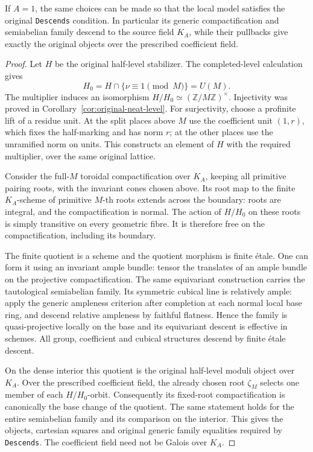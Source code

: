 \begin{proposition}
\label{prop:pel-original-generic-descent}
If $A=1$, the same choices can be made so that the local model
satisfies the original \texttt{Descends} condition.  In particular
its generic compactification and semiabelian family descend to
the source field $K_A$, while their pullbacks give exactly the
original objects over the prescribed coefficient field.
\end{proposition}
\begin{proof}
Let $H$ be the original half-level stabilizer.  The completed-level
calculation gives
\[
 H_0=H\cap\{\nu\equiv1\pmod M\}=U(M).
\]
The multiplier induces an isomorphism
$H/H_0\simeq(\mathbb Z/M\mathbb Z)^\times$.
Injectivity was proved in Corollary~\ref{cor:original-neat-level}.
For surjectivity, choose a profinite lift of a residue unit.  At
the split places above $M$ use the coefficient unit $(1,r)$,
which fixes the half-marking and has norm $r$; at the other places
use the unramified norm on units.  This constructs an element of
$H$ with the required multiplier, over the same original lattice.

Consider the full-$M$ toroidal compactification over $K_A$, keeping
all primitive pairing roots, with the invariant cones chosen above.
Its root map to the finite \(K_A\)-scheme of primitive $M$-th
roots extends across the boundary: roots are integral, and the
compactification is normal.  The action of $H/H_0$ on these roots
is simply transitive on every geometric fibre.  It is therefore
free on the compactification, including its boundary.

The finite quotient is a scheme and the quotient morphism is
finite \'etale.  One can form it using an invariant ample bundle:
tensor the translates of an ample bundle on the projective
compactification.  The same equivariant construction carries the
tautological semiabelian family.  Its symmetric cubical line is
relatively ample: apply the generic ampleness criterion
\cite[Lemma 4.2.1.6]{level-symmetry-lan} after completion at each
normal local base ring, and descend relative ampleness by faithful
flatness.  Hence the family is
quasi-projective locally on the base and its equivariant descent
is effective in schemes.  All group, coefficient and cubical
structures descend by finite \'etale descent.

On the dense interior this quotient is the original half-level
moduli object over $K_A$.  Over the prescribed coefficient field,
the already chosen root $\zeta_M$ selects one member of each
$H/H_0$-orbit.  Consequently its fixed-root compactification is
canonically the base change of the quotient.  The same statement
holds for the entire semiabelian family and its comparison on the
interior.  This gives the objects, cartesian squares and original
generic family equalities required by \texttt{Descends}.
The coefficient field need not be Galois over $K_A$.
\end{proof}

